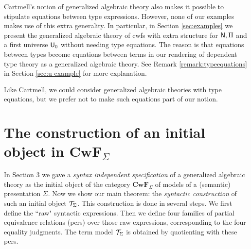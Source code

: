 \documentclass{mscs}
\newcommand{\FYI}[1]{{#1}}
\def\Cwf{\mathbf{CwF}}
\begin{document}
\begin{remark}
Cartmell's notion of generalized algebraic theory \cite{cartmell:phd,cartmell:apal} also makes it possible to stipulate equations between type expressions. However, none of our examples makes use of this extra generality. In particular,  in Section \ref{sec:examples} we present the generalized algebraic theory of cwfs with extra structure for $\mathsf{N}, \Pi$ and a first universe $\mathsf{U}_0$ without needing type equations. The reason is that
equations between types become equations between terms in our rendering
of dependent type theory as a generalized algebraic theory. See Remark \ref{remark:typeequations} in Section \ref{sec:u-example} for more explanation.

Like Cartmell, we could consider generalized algebraic theories with type equations, but we prefer not to make such equations part of our notion.


\end{remark}



\section{The construction of an initial object in $\Cwf_\Sigma$}\label{initial-gat-section}

In Section 3 we gave a {\em syntax independent specification} of a generalized algebraic theory as the initial object of the category $\Cwf_\Sigma$ of models of a (semantic) \FYI{presentation} $\Sigma$. Now we show our main theorem: the {\em syntactic construction} of such an initial object ${\mathcal T}_\Sigma$. This construction is done in several steps. We first define the ``raw" syntactic expressions. Then we define four families of partial equivalence relations (pers) over those raw expressions, corresponding to the four equality judgments. The term model ${\mathcal T}_\Sigma$ is obtained by quotienting with these pers.
\end{document}
